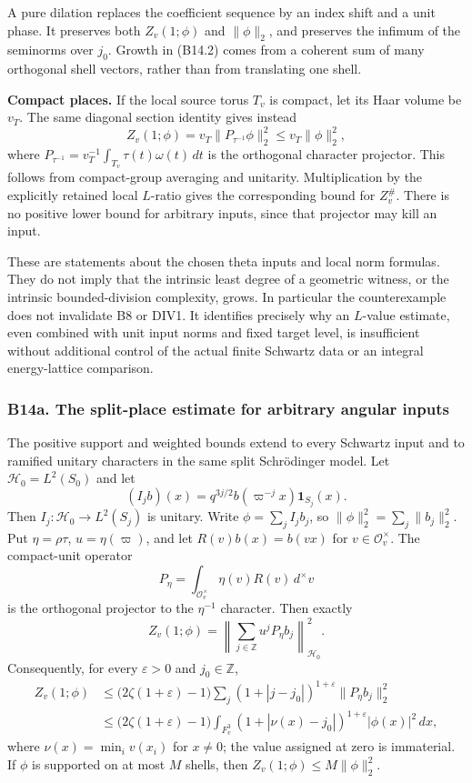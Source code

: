 \documentclass[11pt,a4paper]{article}
\theoremstyle{definition}
\begin{document}
A pure dilation replaces the coefficient sequence by an index shift and a unit phase. It preserves both \(Z_v(1;\phi)\) and \(\|\phi\|_2\), and preserves the infimum of the seminorms over \(j_0\). Growth in (B14.2) comes from a coherent sum of many orthogonal shell vectors, rather than from translating one shell.

\textbf{Compact places.} If the local source torus \(T_v\) is compact, let its Haar volume be \(v_T\). The same diagonal section identity gives instead \[
 Z_v(1;\phi)=v_T\|P_{\tau^{-1}}\phi\|_2^2
 \le v_T\|\phi\|_2^2,
\tag{B14.4}
\] where \(P_{\tau^{-1}}=v_T^{-1}\int_{T_v}\tau(t)\omega(t)\,dt\) is the orthogonal character projector. This follows from compact-group averaging and unitarity. Multiplication by the explicitly retained local \(L\)-ratio gives the corresponding bound for \(Z_v^\#\). There is no positive lower bound for arbitrary inputs, since that projector may kill an input.

These are statements about the chosen theta inputs and local norm formulas. They do not imply that the intrinsic least degree of a geometric witness, or the intrinsic bounded-division complexity, grows. In particular the counterexample does not invalidate B8 or DIV1. It identifies precisely why an \(L\)-value estimate, even combined with unit input norms and fixed target level, is insufficient without additional control of the actual finite Schwartz data or an integral energy-lattice comparison.

\subsubsection{B14a. The split-place estimate for arbitrary angular inputs}\label{b14a.-the-split-place-estimate-for-arbitrary-angular-inputs}

The positive support and weighted bounds extend to every Schwartz input and to ramified unitary characters in the same split Schrödinger model. Let \(\mathcal H_0=L^2(S_0)\) and let \[
 (I_j b)(x)=q^{3j/2}b(\varpi^{-j}x)\mathbf1_{S_j}(x).
\] Then \(I_j:\mathcal H_0\to L^2(S_j)\) is unitary. Write \(\phi=\sum_j I_jb_j\), so \(\|\phi\|_2^2=\sum_j\|b_j\|_2^2\). Put \(\eta=\rho\tau\), \(u=\eta(\varpi)\), and let \(R(v)b(x)=b(vx)\) for \(v\in\mathcal O_v^\times\). The compact-unit operator \[
 P_\eta=\int_{\mathcal O_v^\times}\eta(v)R(v)\,d^\times v
\] is the orthogonal projector to the \(\eta^{-1}\) character. Then exactly \[
 Z_v(1;\phi)=
 \left\|\sum_{j\in\mathbb Z}u^jP_\eta b_j\right\|_{\mathcal H_0}^2.
\tag{B14a.1}
\] Consequently, for every \(\varepsilon>0\) and \(j_0\in\mathbb Z\), \[
 \begin{aligned}
 Z_v(1;\phi)
 &\le \bigl(2\zeta(1+\varepsilon)-1\bigr)
 \sum_j(1+|j-j_0|)^{1+\varepsilon}\|P_\eta b_j\|_2^2\\
 &\le \bigl(2\zeta(1+\varepsilon)-1\bigr)
 \int_{F_v^3}(1+|\nu(x)-j_0|)^{1+\varepsilon}|\phi(x)|^2\,dx,
 \end{aligned}
\tag{B14a.2}
\] where \(\nu(x)=\min_i v(x_i)\) for \(x\ne0\); the value assigned at zero is immaterial. If \(\phi\) is supported on at most \(M\) shells, then \(Z_v(1;\phi)\le M\|\phi\|_2^2\).
\end{document}
